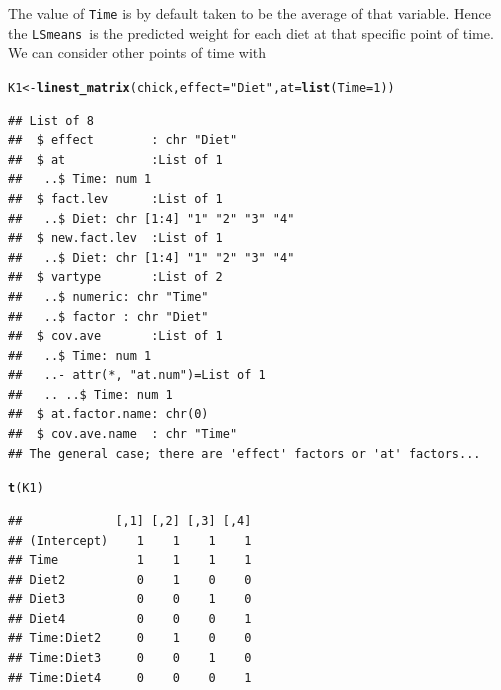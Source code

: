 \documentclass[10pt]{article}\usepackage[]{graphicx}\usepackage[]{color}
\makeatletter
\newcommand{\hlnum}[1]{\textcolor[rgb]{0.686,0.059,0.569}{#1}}%
\newcommand{\hlstr}[1]{\textcolor[rgb]{0.192,0.494,0.8}{#1}}%
\newcommand{\hlstd}[1]{\textcolor[rgb]{0.345,0.345,0.345}{#1}}%
\newcommand{\hlkwb}[1]{\textcolor[rgb]{0.69,0.353,0.396}{#1}}%
\newcommand{\hlkwc}[1]{\textcolor[rgb]{0.333,0.667,0.333}{#1}}%
\newcommand{\hlkwd}[1]{\textcolor[rgb]{0.737,0.353,0.396}{\textbf{#1}}}%
\newenvironment{kframe}{%
 \def\at@end@of@kframe{}%
 \ifinner\ifhmode%
  \def\at@end@of@kframe{\end{minipage}}%
  \begin{minipage}{\columnwidth}%
 \fi\fi%
 \def\FrameCommand##1{\hskip\@totalleftmargin \hskip-\fboxsep
 \colorbox{shadecolor}{##1}\hskip-\fboxsep
     \hskip-\linewidth \hskip-\@totalleftmargin \hskip\columnwidth}%
 \MakeFramed {\advance\hsize-\width
   \@totalleftmargin\z@ \linewidth\hsize
   \@setminipage}}%
 {\par\unskip\endMakeFramed%
 \at@end@of@kframe}
\newenvironment{knitrout}{}{} %
\def\code#1{\texttt{#1}}
\def\cc#1{\texttt{#1}}
\def\lsmeans{\code{LSmeans}}
\makeatother
\begin{document}
The value of \cc{Time} is by default taken to be the average of that
variable. Hence the \lsmeans\ is the predicted weight for each diet at
that specific point of time. We can consider other points of time with
\begin{knitrout}
\color{fgcolor}\begin{kframe}
\begin{alltt}
\hlstd{K1} \hlkwb{<-} \hlkwd{linest_matrix}\hlstd{(chick,} \hlkwc{effect}\hlstd{=}\hlstr{"Diet"}\hlstd{,} \hlkwc{at}\hlstd{=}\hlkwd{list}\hlstd{(}\hlkwc{Time}\hlstd{=}\hlnum{1}\hlstd{))}
\end{alltt}
\begin{verbatim}
## List of 8
##  $ effect        : chr "Diet"
##  $ at            :List of 1
##   ..$ Time: num 1
##  $ fact.lev      :List of 1
##   ..$ Diet: chr [1:4] "1" "2" "3" "4"
##  $ new.fact.lev  :List of 1
##   ..$ Diet: chr [1:4] "1" "2" "3" "4"
##  $ vartype       :List of 2
##   ..$ numeric: chr "Time"
##   ..$ factor : chr "Diet"
##  $ cov.ave       :List of 1
##   ..$ Time: num 1
##   ..- attr(*, "at.num")=List of 1
##   .. ..$ Time: num 1
##  $ at.factor.name: chr(0) 
##  $ cov.ave.name  : chr "Time"
## The general case; there are 'effect' factors or 'at' factors...
\end{verbatim}
\begin{alltt}
\hlkwd{t}\hlstd{(K1)}
\end{alltt}
\begin{verbatim}
##             [,1] [,2] [,3] [,4]
## (Intercept)    1    1    1    1
## Time           1    1    1    1
## Diet2          0    1    0    0
## Diet3          0    0    1    0
## Diet4          0    0    0    1
## Time:Diet2     0    1    0    0
## Time:Diet3     0    0    1    0
## Time:Diet4     0    0    0    1
\end{verbatim}
\end{kframe}
\end{knitrout}
\end{document}
